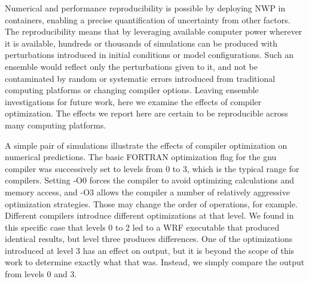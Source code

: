 \documentclass[final]{ametsoc}
\begin{document}
Numerical and performance reproducibility is possible by deploying NWP in containers, enabling a precise quantification of uncertainty from other factors. The reproducibility means that by leveraging available computer power wherever it is available, hundreds or thousands of simulations can be produced with perturbations introduced in initial conditions or model configurations. Such an ensemble would reflect only the perturbations given to it, and not be contaminated by random or systematic errors introduced from traditional computing platforms or changing compiler options.  Leaving ensemble investigations for future work, here we examine the effects of compiler optimization. The effects we report here are certain to be reproducible across many computing platforms. 

A simple pair of simulations illustrate the effects of compiler optimization on numerical predictions. The basic FORTRAN optimization flag for the gnu compiler was successively set to levels from 0 to 3, which is the typical range for compilers.  Setting -O0 forces the compiler to avoid optimizing calculations and memory access, and -O3 allows the compiler a number of relatively aggressive optimization strategies. Those may change the order of operations, for example. Different compilers introduce different optimizations at that level. We found in this specific case that levels 0 to 2 led to a WRF executable that produced identical results, but level three produces differences. One of the optimizations introduced at level 3 has an effect on output, but it is beyond the scope of this work to determine exactly what that was. Instead, we simply compare the output from levels 0 and 3.
\end{document}
